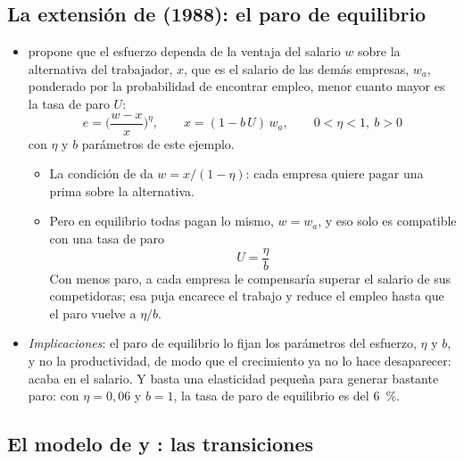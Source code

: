 \documentclass[11pt]{article}
\begin{document}
\subsection{La extensión de  (1988): el paro de equilibrio}\label{anexo:summers}

\begin{itemize}
\item \textcite{Summers1988Relative} propone que el esfuerzo dependa de la ventaja del salario $w$ sobre la alternativa del trabajador, $x$, que es el salario de las demás empresas, $w_a$, ponderado por la probabilidad de encontrar empleo, menor cuanto mayor es la tasa de paro $U$:
  $$e=\Big(\frac{w-x}{x}\Big)^{\eta},\qquad x=(1-b\,U)\,w_a,\qquad 0<\eta<1,\ b>0$$
  con $\eta$ y $b$ parámetros de este ejemplo.
  \begin{itemize}
  \item La condición de  da $w=x/(1-\eta)$: cada empresa quiere pagar una prima sobre la alternativa.
  \item Pero en equilibrio todas pagan lo mismo, $w=w_a$, y eso solo es compatible con una tasa de paro
    \begin{equation}
    U=\frac{\eta}{b} \label{eq:paro-summers}
    \end{equation}
    Con menos paro, a cada empresa le compensaría superar el salario de sus competidoras; esa puja encarece el trabajo y reduce el empleo hasta que el paro vuelve a $\eta/b$.
  \end{itemize}
\item \emph{Implicaciones}: el paro de equilibrio lo fijan los parámetros del esfuerzo, $\eta$ y $b$, y no la productividad, de modo que el crecimiento ya no lo hace desaparecer: acaba en el salario. Y basta una elasticidad pequeña para generar bastante paro: con $\eta=0{,}06$ y $b=1$, la tasa de paro de equilibrio es del 6~\%\nocite{Romer2019Advanced}.
\end{itemize}

\subsection{El modelo de  y : las transiciones}\label{anexo:ss-transiciones}

\begin{infografia}[H]
\centering
\caption{Los 3~estados del trabajador en el modelo de  y  y las tasas de transición}\label{figu:estados-ss}
\end{infografia}
\end{document}
